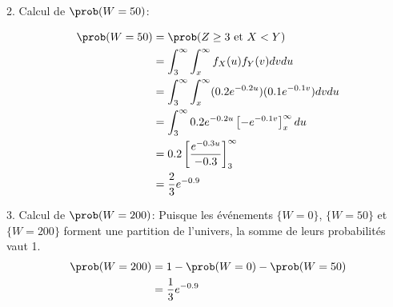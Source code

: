{\begin{enumerate}
{			2. Calcul de $\prob(W=50)$:

			\begin{align*} \prob(W=50) &= \prob(Z \ge 3 \text{ et } X < Y) \\ &= \int_3^\infty \int_x^\infty f_X(u) f_Y(v) dv du \\ 
				&= \int_3^\infty \int_x^\infty (0.2 e^{-0.2 u}) (0.1 e^{-0.1 v}) dv du \\
				&= \int_3^\infty 0.2 e^{-0.2 u} \left[ -e^{-0.1 v} \right]_x^\infty du \\
				&= 0.2 \left[ \frac{e^{-0.3 u}}{-0.3} \right]_3^\infty \\
				&= \frac{2}{3} e^{-0.9} 
			\end{align*}
			
			3. Calcul de $\prob(W=200)$:
			Puisque les événements $\{W=0\}$, $\{W=50\}$ et $\{W=200\}$ forment une partition de l'univers, la somme de leurs probabilités vaut 1.
			\begin{align*} \prob(W=200) &= 1 - \prob(W=0) - \prob(W=50) \\ 
				&= \frac{1}{3} e^{-0.9} 
				\end{align*}

		}
		
	\end{enumerate}
	
}